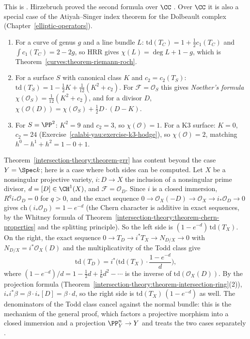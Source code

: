 This is \cite[Theorem 15.2 and Corollary 15.2.1]{fulton-intersection}. Hirzebruch proved the second formula over $\CC$ \cite{hirzebruch-topological}. Over $\CC$ it is also a special case of
the Atiyah--Singer index theorem for the Dolbeault complex (Chapter~\ref{elliptic-operators}).

\begin{example}\label{intersection-theory:example-riemann-roch}
\begin{enumerate}
\item For a curve of genus $g$ and a line bundle $L$: $\mathrm{td}(T_C) = 1 + \frac12c_1(T_C)$ and $\int c_1(T_C) = 2 - 2g$, so HRR gives $\chi(L) = \deg L + 1 - g$, which is
Theorem~\ref{curves:theorem-riemann-roch}.
\item For a surface $S$ with canonical class $K$ and $c_2 = c_2(T_S)$: $\mathrm{td}(T_S) = 1 - \frac12K + \frac1{12}(K^2 + c_2)$. For $\mathcal{F} = \mathcal{O}_S$ this gives
\emph{Noether's formula} $\chi(\mathcal{O}_S) = \frac1{12}(K^2 + c_2)$, and for a divisor $D$,
$\chi(\mathcal{O}(D)) = \chi(\mathcal{O}_S) + \frac12D\cdot(D - K)$.
\item For $S = \PP^2$: $K^2 = 9$ and $c_2 = 3$, so $\chi(\mathcal{O}) = 1$. For a K3 surface: $K = 0$, $c_2 = 24$ (Exercise~\ref{calabi-yau:exercise-k3-hodge}), so $\chi(\mathcal{O}) = 2$,
matching $h^0 - h^1 + h^2 = 1 - 0 + 1$.
\end{enumerate}
\end{example}

\begin{example}\label{intersection-theory:example-grr-divisor}
Theorem~\ref{intersection-theory:theorem-grr} has content beyond the case $Y = \Spec k$; here is a case where both sides can be computed. Let $X$ be a nonsingular projective variety, $i \colon D \to X$ the inclusion of a
nonsingular prime divisor, $d = [D] \in \CH^1(X)$, and $\mathcal{F} = \mathcal{O}_D$. Since $i$ is a closed immersion, $R^qi_*\mathcal{O}_D = 0$ for $q > 0$, and the exact sequence
$0 \to \mathcal{O}_X(-D) \to \mathcal{O}_X \to i_*\mathcal{O}_D \to 0$ gives $\mathrm{ch}(i_*\mathcal{O}_D) = 1 - e^{-d}$ (the Chern character is additive in exact sequences, by the Whitney formula of
Theorem~\ref{intersection-theory:theorem-chern-properties} and the splitting principle). So the left side is $(1 - e^{-d})\,\mathrm{td}(T_X)$. On the right, the exact sequence $0 \to T_D \to i^*T_X \to N_{D/X} \to 0$ with
$N_{D/X} = i^*\mathcal{O}_X(D)$ and the multiplicativity of the Todd class give
\[
\mathrm{td}(T_D) = i^*\Big(\mathrm{td}(T_X)\cdot\frac{1 - e^{-d}}{d}\Big),
\]
where $(1 - e^{-d})/d = 1 - \frac12d + \frac16d^2 - \cdots$ is the inverse of $\mathrm{td}(\mathcal{O}_X(D))$. By the projection formula (Theorem~\ref{intersection-theory:theorem-intersection-ring}(2)), $i_*i^*\beta = \beta \cdot i_*[D] = \beta \cdot d$,
so the right side is $\mathrm{td}(T_X)\,(1 - e^{-d})$ as well. The denominators of the Todd class cancel against the normal bundle: this is the mechanism of the general proof, which factors a projective morphism into a
closed immersion and a projection $\PP^n_Y \to Y$ and treats the two cases separately \cite[Chapter 15]{fulton-intersection}.
\end{example}

